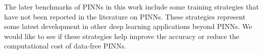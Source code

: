 The later benchmarks of PINNs in this work include some training strategies that have not been reported in the literature on PINNs.
These strategies represent some latest development in other deep learning applications beyond PINNs.
We would like to see if these strategies help improve the accuracy or reduce the computational cost of data-free PINNs.
